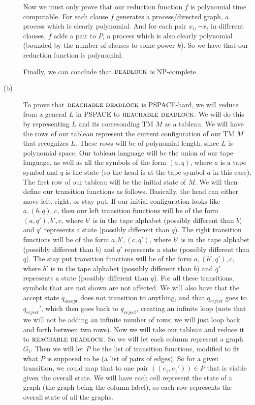 \documentclass{article}
\begin{document}
\begin{description}
        Now we must only prove that our reduction function $f$ is polynomial
        time computable. For each clause $f$ generates a process/directed graph,
        a process which is clearly polynomial. And for each pair $x_i, \neg
        x_i$ in different clauses, $f$ adds a pair to $P$, a process which is
        also clearly polynomial (bounded by the number of clauses to some power
        $k$). So we have that our reduction function is polynomial.

        Finally, we can conclude that $\mbox{\sc deadlock}$ is NP-complete.

    \item[(b)]
        To prove that $\mbox{\sc reachable deadlock}$ is PSPACE-hard, we
        will reduce from a general $L$ in PSPACE to $\mbox{\sc reachable
        deadlock}$. We will do this by representing $L$ and its corresonding
        TM $M$ as a tableau. We will have the
        rows of our tableau represent the current configuration of our TM $M$ that
        recognizes $L$. These rows will be of polynomial length, since
        $L$ is polynomial space. Our tableau language will be the union of our
        tape language, as well as all the symbols of the form
        $(a, q)$, where $a$ is a tape symbol and $q$ is the state (so the head
        is at the tape symbol $a$ in this case). The first row of our tableau
        will be the initial state of $M$. We will then define our transition
        functions as follows. Basically, the head can either move left, right,
        or stay put. If our initial configuration looks like $a, (b, q), c$,
        then our left transition functions will be of the form
        $(a, q'), b', c$, where $b'$ is in the tape alphabet (possibly different
        than $b$) and $q'$ represents a state (possibly different than $q$).
        The right transition functions will be of the form
        $a, b', (c, q')$, where $b'$ is in the tape alphabet (possibly
        different than $b$) and $q'$ represents a state (possibly different than $q$).
        The stay put transition functions will be of the form
        $a, (b', q'), c$, where $b'$ is in the tape alphabet (possibly
        different than $b$) and $q'$ represents a state (possibly different than $q$).
        For all these transitions, symbols that are not shown are not affected.
        We will also have that the accept state $q_{accept}$ does not transition
        to anything, and that $q_{reject}$ goes to $q_{reject}'$, which then
        goes back to $q_{reject}$, creating an infinite loop (note that we
        will not be adding an infinite number of rows; we will just loop back
        and forth between two rows). Now we will take
        our tableau and reduce it to $\mbox{\sc reachable deadlock}$. So we will
        let each column represent a graph $G_i$. Then we will let $P$ be
        the list of transition functions, modified to fit what $P$ is supposed
        to be (a list of pairs of edges). So for a given transition, we could
        map that to one pair $((e_1, e_1')) \in P$ that is viable given
        the overall state. We will have each cell represent
        the state of a graph (the graph being the column label), so each row
        represents the overall state of all the graphs.


\end{description}
\end{document}
